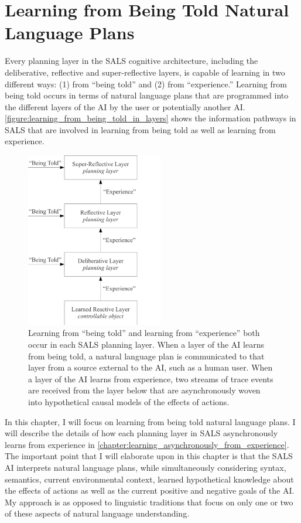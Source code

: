 \chapter{Learning from Being Told Natural Language Plans}
\label{chapter:learning_from_being_told_natural_language_plans}

Every planning layer in the SALS cognitive architecture, including the
deliberative, reflective and super-reflective layers, is capable of
learning in two different ways: (1) from ``being told'' and (2) from
``experience.''  Learning from being told occurs in terms of natural
language plans that are programmed into the different layers of the AI
by the user or potentially another AI.
{\mbox{\autoref{figure:learning_from_being_told_in_layers}}} shows the
information pathways in SALS that are involved in learning from being
told as well as learning from experience.
\begin{figure}
\centering
\includegraphics[width=6cm]{gfx/learning_from_being_told_in_layers}
\caption[Learning from ``being told'' and learning from ``experience''
  both occur in each SALS planning layer.]{Learning from ``being
  told'' and learning from ``experience'' both occur in each SALS
  planning layer.  When a layer of the AI learns from being told, a
  natural language plan is communicated to that layer from a source
  external to the AI, such as a human user.  When a layer of the AI
  learns from experience, two streams of trace events are received
  from the layer below that are asynchronously woven into hypothetical
  causal models of the effects of actions.}
\label{figure:learning_from_being_told_in_layers}
\end{figure}
In this chapter, I will focus on learning from being told natural
language plans.  I will describe the details of how each planning
layer in SALS asynchronously learns from experience in
{\mbox{\autoref{chapter:learning_asynchronously_from_experience}}}.
The important point that I will elaborate upon in this chapter is that
the SALS AI interprets natural language plans, while simultaneously
considering syntax, semantics, current environmental context, learned
hypothetical knowledge about the effects of actions as well as the
current positive and negative goals of the AI.  My approach is as
opposed to linguistic traditions that focus on only one or two of
these aspects of natural language understanding.

